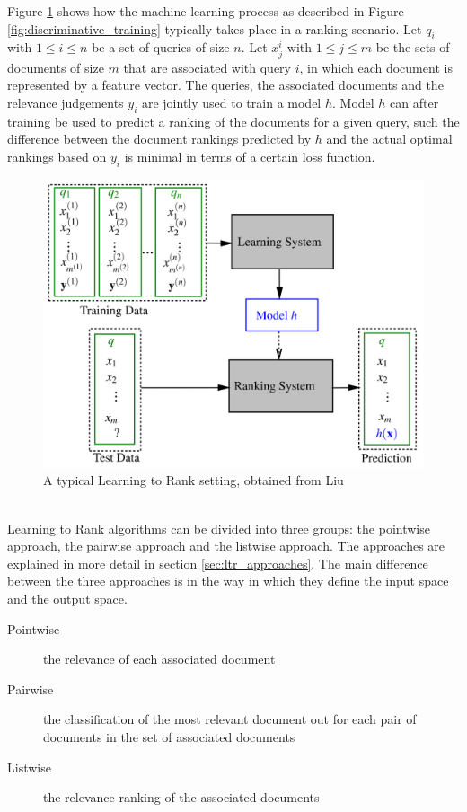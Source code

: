 Figure \ref{fig:ltr_framework} shows how the machine learning process as described in Figure \ref{fig:discriminative_training} typically takes place in a ranking scenario. Let $q_i$ with $1 \le i \le n$ be a set of queries of size $n$. Let $x_j^i$ with $1 \le j \le m$ be the sets of documents of size $m$ that are associated with query $i$, in which each document is represented by a feature vector. The queries, the associated documents and the relevance judgements $y_i$ are jointly used to train a model $h$. Model $h$ can after training be used to predict a ranking of the documents for a given query, such the difference between the document rankings predicted by $h$ and the actual optimal rankings based on $y_i$ is minimal in terms of a certain loss function.
\begin{figure}[!h]
\centering
\includegraphics[scale=0.36]{gfx/ltr_framework}
\caption{A typical Learning to Rank setting, obtained from Liu \cite{Liu2007}}
\label{fig:ltr_framework}
\end{figure}\\

Learning to Rank algorithms can be divided into three groups: the pointwise approach, the pairwise approach and the listwise approach. The approaches are explained in more detail in section \ref{sec:ltr_approaches}. The main difference between the three approaches is in the way in which they define the input space and the output space. 
\begin{description}
\item[Pointwise] the relevance of each associated document
\item[Pairwise] the classification of the most relevant document out for each pair of documents in the set of associated documents
\item[Listwise] the relevance ranking of the associated documents
\end{description}
\smallskip

